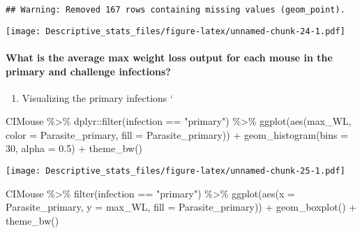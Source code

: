 \documentclass[
]{article}
\newenvironment{Shaded}{\begin{snugshade}}{\end{snugshade}}
\newcommand{\AttributeTok}[1]{\textcolor[rgb]{0.77,0.63,0.00}{#1}}
\newcommand{\DecValTok}[1]{\textcolor[rgb]{0.00,0.00,0.81}{#1}}
\newcommand{\FloatTok}[1]{\textcolor[rgb]{0.00,0.00,0.81}{#1}}
\newcommand{\FunctionTok}[1]{\textcolor[rgb]{0.00,0.00,0.00}{#1}}
\newcommand{\NormalTok}[1]{#1}
\newcommand{\SpecialCharTok}[1]{\textcolor[rgb]{0.00,0.00,0.00}{#1}}
\newcommand{\StringTok}[1]{\textcolor[rgb]{0.31,0.60,0.02}{#1}}
\providecommand{\tightlist}{%
  \setlength{\itemsep}{0pt}\setlength{\parskip}{0pt}}
\begin{document}
\begin{verbatim}
## Warning: Removed 167 rows containing missing values (geom_point).
\end{verbatim}

\texttt{[image: Descriptive\_stats\_files/figure-latex/unnamed-chunk-24-1.pdf]}

\hypertarget{what-is-the-average-max-weight-loss-output-for-each-mouse-in-the-primary-and-challenge-infections}{%
\paragraph{What is the average max weight loss output for each mouse in
the primary and challenge
infections?}\label{what-is-the-average-max-weight-loss-output-for-each-mouse-in-the-primary-and-challenge-infections}}

\begin{enumerate}
\def\labelenumi{\arabic{enumi}.}
\tightlist
\item
  Visualizing the primary infections `
\end{enumerate}

\begin{Shaded}
\begin{Highlighting}[]
\NormalTok{CIMouse }\SpecialCharTok{\%\textgreater{}\%}
\NormalTok{    dplyr}\SpecialCharTok{::}\FunctionTok{filter}\NormalTok{(infection }\SpecialCharTok{==} \StringTok{"primary"}\NormalTok{) }\SpecialCharTok{\%\textgreater{}\%}
  \FunctionTok{ggplot}\NormalTok{(}\FunctionTok{aes}\NormalTok{(max\_WL, }\AttributeTok{color =}\NormalTok{ Parasite\_primary, }\AttributeTok{fill =}\NormalTok{ Parasite\_primary)) }\SpecialCharTok{+}
  \FunctionTok{geom\_histogram}\NormalTok{(}\AttributeTok{bins =} \DecValTok{30}\NormalTok{, }\AttributeTok{alpha =} \FloatTok{0.5}\NormalTok{)  }\SpecialCharTok{+}
    \FunctionTok{theme\_bw}\NormalTok{()}
\end{Highlighting}
\end{Shaded}

\texttt{[image: Descriptive\_stats\_files/figure-latex/unnamed-chunk-25-1.pdf]}

\begin{Shaded}
\begin{Highlighting}[]
\NormalTok{CIMouse  }\SpecialCharTok{\%\textgreater{}\%}
    \FunctionTok{filter}\NormalTok{(infection }\SpecialCharTok{==} \StringTok{"primary"}\NormalTok{)  }\SpecialCharTok{\%\textgreater{}\%}
  \FunctionTok{ggplot}\NormalTok{(}\FunctionTok{aes}\NormalTok{(}\AttributeTok{x =}\NormalTok{ Parasite\_primary, }\AttributeTok{y =}\NormalTok{ max\_WL, }\AttributeTok{fill =}\NormalTok{ Parasite\_primary)) }\SpecialCharTok{+}
  \FunctionTok{geom\_boxplot}\NormalTok{() }\SpecialCharTok{+}
    \FunctionTok{theme\_bw}\NormalTok{()}
\end{Highlighting}
\end{Shaded}
\end{document}
